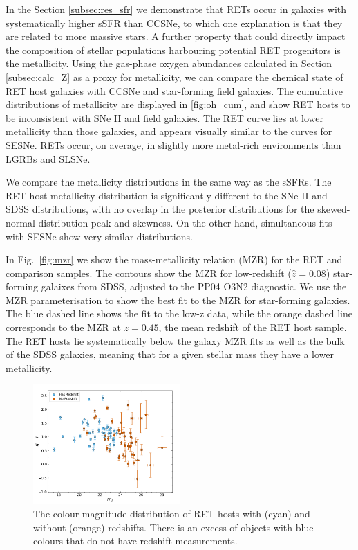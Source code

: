 \documentclass[fleqn,usenatbib,]{mnras}
\begin{document}
In the Section \ref{subsec:res_sfr} we demonstrate that RETs occur in galaxies with systematically higher sSFR than CCSNe, to which one explanation is that they are related to more massive stars. A further property that could directly impact the composition of stellar populations harbouring potential RET progenitors is the metallicity. Using the gas-phase oxygen abundances calculated in Section \ref{subsec:calc_Z} as a proxy for metallicity, we can compare the chemical state of RET host galaxies with CCSNe and star-forming field galaxies. The cumulative distributions of metallicity are displayed in \ref{fig:oh_cum}, and show RET hosts to be inconsistent with SNe II and field galaxies. The RET curve lies at lower metallicity than those galaxies, and appears visually similar to the curves for SESNe. RETs occur, on average, in slightly more metal-rich environments than LGRBs and SLSNe.

We compare the metallicity distributions in the same way as the sSFRs. The RET host metallicity distribution is significantly different to the SNe II and SDSS distributions, with no overlap in the posterior distributions for the skewed-normal distribution peak and skewness. On the other hand, simultaneous fits with SESNe show very similar distributions.

In Fig.~\ref{fig:mzr} we show the mass-metallicity relation (MZR) for the RET and comparison samples. The contours show the MZR for low-redshift ($\hat{z}=0.08$) star-forming galaixes from SDSS, adjusted to the PP04 O3N2 diagnostic. We use the MZR parameterisation \citet{Zahid2014} to show the best fit to the MZR for star-forming galaxies. The blue dashed line shows the fit to the low-z data, while the orange dashed line corresponds to the MZR at $z=0.45$, the mean redshift of the RET host sample. The RET hosts lie systematically below the galaxy MZR fits as well as the bulk of the SDSS galaxies, meaning that for a given stellar mass they have a lower metallicity.

\begin{figure}
\includegraphics[width=0.5\textwidth]{figs/mag_v_colour.png}
\caption{The colour-magnitude distribution of RET hosts with (cyan) and without (orange) redshifts. There is an excess of objects with blue colours that do not have redshift measurements.
\label{fig:g-i}}
\end{figure}
\end{document}
